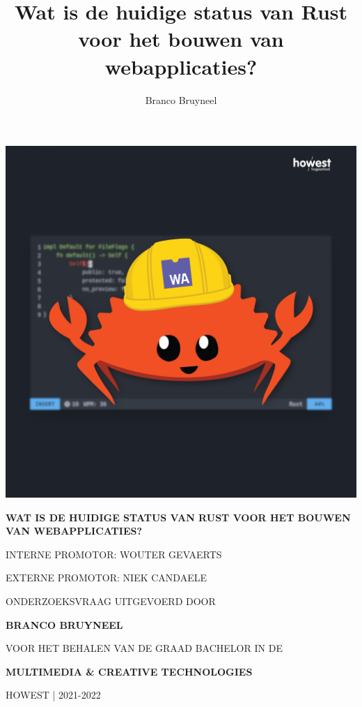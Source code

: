 \documentclass[11pt, oneside]{book}
\author{Branco Bruyneel}
\title{Wat is de huidige status van Rust voor het bouwen van webapplicaties?}
\begin{document}
\begin{titlepage}
    \begin{center}
      \includegraphics[width=\textwidth]{test3}
    \end{center}
    \begin{adjustwidth}{1.5cm}{1.5cm}

    \vspace{0.5em}

    \begin{spacing}{1.5}
    \MakeUppercase{\huge\textbf{Wat is de huidige status van Rust voor het bouwen van
    webapplicaties?}}
    \end{spacing}

    \vspace{1em}

    \MakeUppercase{interne promotor: Wouter Gevaerts}

    \MakeUppercase{externe promotor: Niek Candaele}

    \vspace{1em}

    \MakeUppercase{\small{onderzoeksvraag uitgevoerd door}}

    \MakeUppercase{\Large\textbf{{Branco Bruyneel}}}

    \MakeUppercase{\small{voor het behalen van de graad bachelor in de}}

    \MakeUppercase{\Large{\textbf{{Multimedia \& Creative Technologies}}}}

    \MakeUppercase{Howest | 2021-2022}
    \end{adjustwidth}
\end{titlepage}
\end{document}
